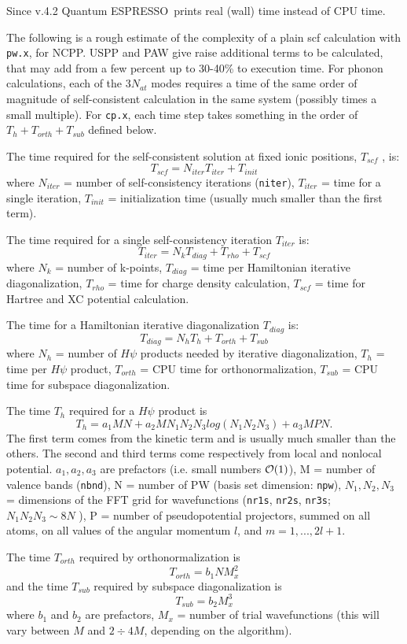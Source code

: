 \documentclass[12pt,a4paper]{article}
\def\qe{{\sc Quantum ESPRESSO}}
\def\pw.x{\texttt{pw.x}}
\def\cp.x{\texttt{cp.x}}
\begin{document}
Since v.4.2 \qe\ prints real (wall) time instead of CPU time.

The following is a rough estimate of the complexity of a plain
scf calculation with \pw.x, for NCPP. USPP and PAW 
give raise additional terms to be calculated, that may add from a 
few percent 
up to 30-40\% to execution time. For phonon calculations, each of the
$3N_{at}$ modes requires a time of the same order of magnitude of
self-consistent calculation in the same system (possibly times a small multiple). 
For \cp.x, each time step takes something in the order of
$T_h + T_{orth} + T_{sub}$ defined below.

The time required for the self-consistent solution at fixed ionic
positions, $T_{scf}$ , is:
$$T_{scf} = N_{iter} T_{iter} + T_{init}$$
where $N_{iter}$  = number of self-consistency iterations (\texttt{niter}), 
$T_{iter}$ =
time for a single iteration, $T_{init}$ = initialization time
(usually much smaller than the first term).

The time required for a single self-consistency iteration $T_{iter}$ is:
$$T_{iter} = N_k T_{diag} +T_{rho} + T_{scf}$$
where $N_k$ = number of k-points, $T_{diag}$ = time per 
Hamiltonian iterative diagonalization, $T_{rho}$ = time for charge density 
calculation, $T_{scf}$ = time for Hartree and XC potential
calculation.
    
The time for a Hamiltonian iterative diagonalization $T_{diag}$ is:
$$T_{diag} = N_h T_h + T_{orth} + T_{sub}$$
where $N_h$ = number of $H\psi$ products needed by iterative diagonalization,
$T_h$ = time per $H\psi$ product, $T_{orth}$ = CPU time for 
orthonormalization, $T_{sub}$ = CPU time for subspace diagonalization.
    
The time $T_h$ required for a $H\psi$ product is
$$T_h = a_1 M N + a_2 M N_1 N_2 N_3 log(N_1 N_2 N_3 ) + a_3 M P N. $$
The first term comes from the kinetic term and is usually much smaller
than the others. The second and third terms come respectively from local
and nonlocal potential. $a_1, a_2, a_3$ are prefactors (i.e.
small numbers ${\cal O}(1)$), M = number of valence
bands (\texttt{nbnd}), N = number of PW (basis set dimension: \texttt{npw}), $N_1, N_2, N_3$ =
dimensions of the FFT grid for wavefunctions (\texttt{nr1s}, \texttt{nr2s},
\texttt{nr3s}; $N_1 N_2 N_3 \sim 8N$ ), 
P = number of pseudopotential projectors, summed on all atoms, on all values of the
angular momentum $l$, and $m = 1, . . . , 2l + 1$.

The time $T_{orth}$ required by orthonormalization is
$$T_{orth} = b_1 N M_x^2$$ 
and the time $T_{sub}$ required by subspace diagonalization is
$$T_{sub} = b_2 M_x^3$$
where $b_1$ and $b_2$ are prefactors, $M_x$ = number of trial wavefunctions 
(this will vary between $M$ and $2\div4 M$, depending on the algorithm).
    
\end{document}
